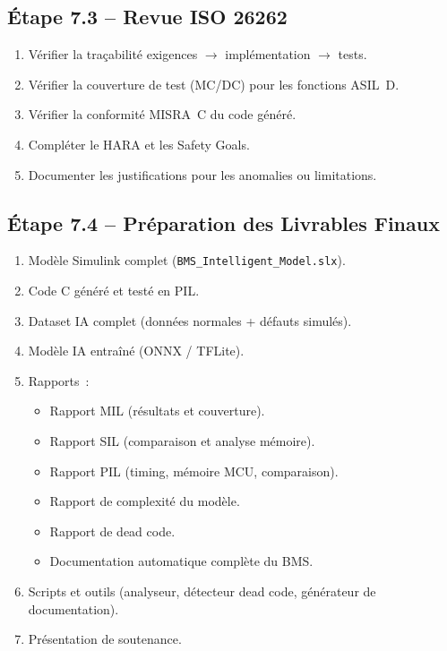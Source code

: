 \documentclass[a4paper,12pt]{article}
\begin{document}
\subsection{Étape 7.3 -- Revue ISO 26262}
\begin{enumerate}[nosep]
  \item Vérifier la traçabilité exigences $\rightarrow$ implémentation $\rightarrow$ tests.
  \item Vérifier la couverture de test (MC/DC) pour les fonctions ASIL~D.
  \item Vérifier la conformité MISRA~C du code généré.
  \item Compléter le HARA et les Safety Goals.
  \item Documenter les justifications pour les anomalies ou limitations.
\end{enumerate}

\subsection{Étape 7.4 -- Préparation des Livrables Finaux}
\begin{enumerate}[nosep]
  \item Modèle Simulink complet (\texttt{BMS\_Intelligent\_Model.slx}).
  \item Code C généré et testé en PIL.
  \item Dataset IA complet (données normales + défauts simulés).
  \item Modèle IA entraîné (ONNX / TFLite).
  \item Rapports~:
    \begin{itemize}[nosep]
      \item Rapport MIL (résultats et couverture).
      \item Rapport SIL (comparaison et analyse mémoire).
      \item Rapport PIL (timing, mémoire MCU, comparaison).
      \item Rapport de complexité du modèle.
      \item Rapport de dead code.
      \item Documentation automatique complète du BMS.
    \end{itemize}
  \item Scripts et outils (analyseur, détecteur dead code, générateur de documentation).
  \item Présentation de soutenance.
\end{enumerate}
\end{document}
